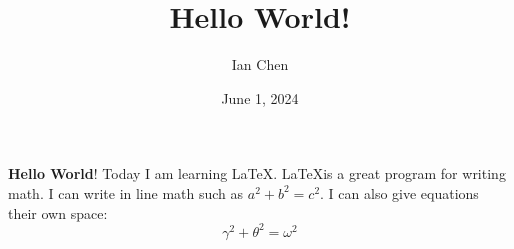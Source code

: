 \documentclass{article}
\title{Hello World!}
\author{Ian Chen}
\date{June 1, 2024}
\begin{document}
\maketitle

\textbf{Hello World}! Today I am learning \LaTeX. \LaTeX is a great program for writing math. I can write in line math such as $a^2+b^2=c^2$. I can also give equations their own space: $$\gamma^2+\theta^2=\omega^2$$
\end{document}
